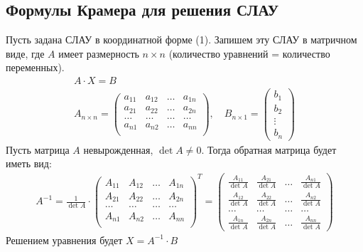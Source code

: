 \subsection{Формулы Крамера для решения СЛАУ}
Пусть задана СЛАУ в координатной форме (1). Запишем эту СЛАУ в матричном виде, где $A$ имеет размерность $n\times n$ (количество уравнений = количество переменных).
\begin{gather*}
A \cdot X = B\\ %
A_{n\times n} = \begin{pmatrix}
a_{11} & a_{12} & \ldots & a_{1n} \\
a_{21} & a_{22} & \ldots & a_{2n} \\
\ldots & \ldots & \ldots & \ldots \\
a_{n1} & a_{n2} & \ldots & a_{nn} \\
\end{pmatrix}, \quad B_{n\times 1} = \begin{pmatrix}
b_1\\
b_2\\
\vdots\\
b_n
\end{pmatrix}
\end{gather*}
Пусть матрица $A$ невырожденная, $\det A \ne 0$. Тогда обратная матрица будет иметь вид:
\begin{gather*}
A^{-1} = \frac{1}{\det A} \cdot \begin{pmatrix}
A_{11} & A_{12} & \ldots & A_{1n} \\
A_{21} & A_{22} & \ldots & A_{2n} \\
\ldots & \ldots & \ldots & \ldots \\
A_{n1} & A_{n2} & \ldots & A_{nn} \\
\end{pmatrix}^{T} = \begin{pmatrix}
\frac{A_{11}}{\det A} & \frac{A_{21}}{\det A} & \ldots & \frac{A_{n1}}{\det A} \\[1ex]
\frac{A_{12}}{\det A} & \frac{A_{22}}{\det A} & \ldots & \frac{A_{n2}}{\det A} \\[1ex]
\ldots & \ldots & \ldots & \ldots\\[1ex]
\frac{A_{1n}}{\det A} & \frac{A_{2n}}{\det A} & \ldots & \frac{A_{nn}}{\det A}
\end{pmatrix}
\end{gather*}
Решением уравнения будет $X = A^{-1} \cdot B$
